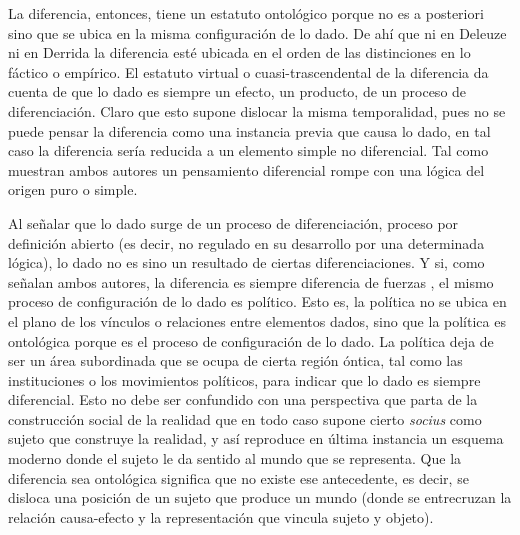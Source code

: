 La diferencia, entonces, tiene un estatuto ontológico porque no es a posteriori sino que se ubica en la misma configuración de lo dado. De ahí que ni en Deleuze ni en Derrida la diferencia esté ubicada en el orden de las distinciones en lo fáctico o empírico. El estatuto virtual o cuasi-trascendental de la diferencia da cuenta de que lo dado es siempre un efecto, un producto, de un proceso de diferenciación. Claro que esto supone dislocar la misma temporalidad, pues no se puede pensar la diferencia como una instancia previa que causa lo dado, en tal caso la diferencia sería reducida a un elemento simple no diferencial. Tal como muestran ambos autores un pensamiento diferencial rompe con una lógica del origen puro o simple.

Al señalar que lo dado surge de un proceso de diferenciación, proceso por definición abierto (es decir, no regulado en su desarrollo por una determinada lógica), lo dado no es sino un resultado de ciertas diferenciaciones. Y si, como señalan ambos autores, la diferencia es siempre diferencia de fuerzas , el mismo proceso de configuración de lo dado es político. Esto es, la política no se ubica en el plano de los vínculos o relaciones entre elementos dados, sino que la política es ontológica porque es el proceso de configuración de lo dado. La política deja de ser un área subordinada que se ocupa de cierta región óntica, tal como las instituciones o los movimientos políticos, para indicar que lo dado es siempre diferencial. Esto no debe ser confundido con una perspectiva que parta de la construcción social de la realidad que en todo caso supone cierto \emph{socius} como sujeto que construye la realidad, y así reproduce en última instancia un esquema moderno donde el sujeto le da sentido al mundo que se representa. Que la diferencia sea ontológica significa que no existe ese antecedente, es decir, se disloca una posición de un sujeto que produce un mundo (donde se entrecruzan la relación causa-efecto y la representación que vincula sujeto y objeto).

